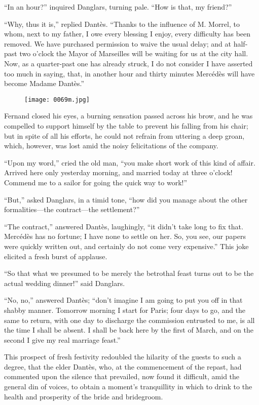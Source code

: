 “In an hour?” inquired Danglars, turning pale. “How is that, my
friend?”

“Why, thus it is,” replied Dantès. “Thanks to the influence of M.
Morrel, to whom, next to my father, I owe every blessing I enjoy, every
difficulty has been removed. We have purchased permission to waive the
usual delay; and at half-past two o’clock the Mayor of Marseilles will
be waiting for us at the city hall. Now, as a quarter-past one has
already struck, I do not consider I have asserted too much in saying,
that, in another hour and thirty minutes Mercédès will have become
Madame Dantès.”

\begin{figure}[ht]
\texttt{[image: 0069m.jpg]}
\end{figure}

Fernand closed his eyes, a burning sensation passed across his brow,
and he was compelled to support himself by the table to prevent his
falling from his chair; but in spite of all his efforts, he could not
refrain from uttering a deep groan, which, however, was lost amid the
noisy felicitations of the company.

“Upon my word,” cried the old man, “you make short work of this kind of
affair. Arrived here only yesterday morning, and married today at three
o’clock! Commend me to a sailor for going the quick way to work!”

“But,” asked Danglars, in a timid tone, “how did you manage about the
other formalities—the contract—the settlement?”

“The contract,” answered Dantès, laughingly, “it didn’t take long to
fix that. Mercédès has no fortune; I have none to settle on her. So,
you see, our papers were quickly written out, and certainly do not come
very expensive.” This joke elicited a fresh burst of applause.

“So that what we presumed to be merely the betrothal feast turns out to
be the actual wedding dinner!” said Danglars.

“No, no,” answered Dantès; “don’t imagine I am going to put you off in
that shabby manner. Tomorrow morning I start for Paris; four days to
go, and the same to return, with one day to discharge the commission
entrusted to me, is all the time I shall be absent. I shall be back
here by the first of March, and on the second I give my real marriage
feast.”

This prospect of fresh festivity redoubled the hilarity of the guests
to such a degree, that the elder Dantès, who, at the commencement of
the repast, had commented upon the silence that prevailed, now found it
difficult, amid the general din of voices, to obtain a moment’s
tranquillity in which to drink to the health and prosperity of the
bride and bridegroom.

